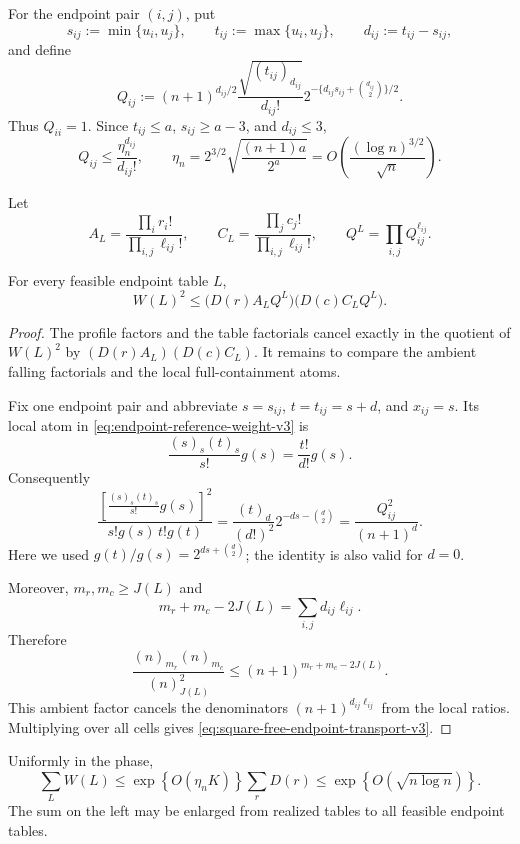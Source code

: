 For the endpoint pair $(i,j)$, put
\[
  s_{ij}:=\min\{u_i,u_j\},
  \qquad
  t_{ij}:=\max\{u_i,u_j\},
  \qquad
  d_{ij}:=t_{ij}-s_{ij},
\]
and define
\[
  Q_{ij}:=
  (n+1)^{d_{ij}/2}
  \frac{\sqrt{(t_{ij})_{d_{ij}}}}{d_{ij}!}
  2^{-\{d_{ij}s_{ij}+\binom{d_{ij}}2\}/2}.
\]
Thus $Q_{ii}=1$. Since $t_{ij}\le a$, $s_{ij}\ge a-3$, and
$d_{ij}\le3$,
\begin{equation}
  Q_{ij}\le\frac{\eta_n^{d_{ij}}}{d_{ij}!},
  \qquad
  \eta_n=
  2^{3/2}\sqrt{\frac{(n+1)a}{2^a}}
  =O\!\left(\frac{(\log n)^{3/2}}{\sqrt n}\right).
  \label{eq:endpoint-eta-v3}
\end{equation}

Let
\[
  A_L=\frac{\prod_i r_i!}{\prod_{i,j}\ell_{ij}!},
  \qquad
  C_L=\frac{\prod_j c_j!}{\prod_{i,j}\ell_{ij}!},
  \qquad
  Q^L=\prod_{i,j}Q_{ij}^{\ell_{ij}}.
\]

\begin{lemma}
For every feasible endpoint table $L$,
\begin{equation}
  W(L)^2
  \le
  \bigl(D(r)A_LQ^L\bigr)\bigl(D(c)C_LQ^L\bigr).
  \label{eq:square-free-endpoint-transport-v3}
\end{equation}
\end{lemma}

\begin{proof}
The profile factors and the table factorials cancel exactly in the quotient of
$W(L)^2$ by $(D(r)A_L)(D(c)C_L)$. It remains to compare the ambient falling
factorials and the local full-containment atoms.

Fix one endpoint pair and abbreviate $s=s_{ij}$, $t=t_{ij}=s+d$, and
$x_{ij}=s$. Its local atom in \eqref{eq:endpoint-reference-weight-v3} is
\[
  \frac{(s)_s(t)_s}{s!}g(s)
  =
  \frac{t!}{d!}g(s).
\]
Consequently
\[
  \frac{
    \left[\frac{(s)_s(t)_s}{s!}g(s)\right]^2
  }{s!g(s)\,t!g(t)}
  =
  \frac{(t)_d}{(d!)^2}
  2^{-ds-\binom d2}
  =
  \frac{Q_{ij}^2}{(n+1)^d}.
\]
Here we used
$g(t)/g(s)=2^{ds+\binom d2}$; the identity is also valid for $d=0$.

Moreover, $m_r,m_c\ge J(L)$ and
\[
  m_r+m_c-2J(L)
  =
  \sum_{i,j}d_{ij}\ell_{ij}.
\]
Therefore
\[
  \frac{(n)_{m_r}(n)_{m_c}}{(n)_{J(L)}^2}
  \le
  (n+1)^{m_r+m_c-2J(L)}.
\]
This ambient factor cancels the denominators $(n+1)^{d_{ij}\ell_{ij}}$ from
the local ratios. Multiplying over all cells gives
\eqref{eq:square-free-endpoint-transport-v3}.
\end{proof}

\begin{proposition}
\label{prop:endpoint-table-sum-v3}
Uniformly in the phase,
\begin{equation}
  \sum_LW(L)
  \le
  \exp\!\left\{O(\eta_nK)\right\}
  \sum_rD(r)
  \le
  \exp\!\left\{O(\sqrt{n\log n})\right\}.
  \label{eq:endpoint-table-sum-v3}
\end{equation}
The sum on the left may be enlarged from realized tables to all feasible
endpoint tables.
\end{proposition}

